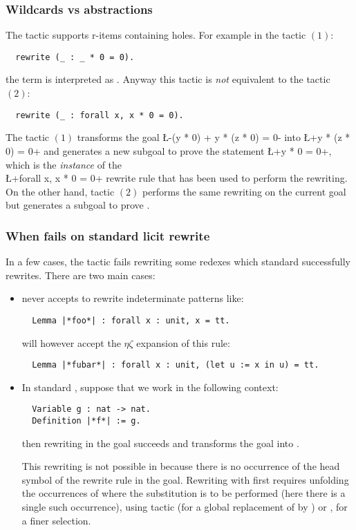 \subsubsection*{Wildcards vs abstractions}
     The  tactic supports r-items containing holes. For example
      in the tactic $(1)$:
\begin{lstlisting}
  rewrite (_ : _ * 0 = 0).
\end{lstlisting}
      the term  is interpreted as .
      Anyway this tactic is \emph{not} equivalent to the tactic $(2)$:
\begin{lstlisting}
  rewrite (_ : forall x, x * 0 = 0).
\end{lstlisting}
      The tactic $(1)$ transforms the goal
      \L-(y * 0) + y * (z * 0) = 0- into \L+y * (z * 0) = 0+
      and generates a new subgoal to prove the statement \L+y * 0 = 0+,
      which is the \emph{instance} of the\\ \L+forall x, x * 0 = 0+
      rewrite rule that
      has been used to perform the rewriting. On the other hand, tactic
      $(2)$ performs the same rewriting on the current goal but generates a
      subgoal to prove .

\subsubsection*{When \ssr{}  fails on standard \Coq{} licit rewrite}
In a few cases, the \ssr{}  tactic fails
rewriting some redexes which standard \Coq{} successfully rewrites.
There are two main cases:

\begin{itemize}
\item \ssr{} never accepts to rewrite indeterminate patterns like:
\begin{lstlisting}
  Lemma |*foo*| : forall x : unit, x = tt.
\end{lstlisting}
\ssr{} will however accept the $\eta\zeta$ expansion of this rule:
\begin{lstlisting}
  Lemma |*fubar*| : forall x : unit, (let u := x in u) = tt.
\end{lstlisting}
\item In standard \Coq{}, suppose that we work in the following context:
\begin{lstlisting}
  Variable g : nat -> nat.
  Definition |*f*| := g.
\end{lstlisting}
then rewriting  in the goal
 succeeds
and transforms the goal into .

This rewriting is not possible in \ssr{} because there is no
occurrence of the head symbol  of the rewrite rule in the
goal. Rewriting with  first requires unfolding the occurrences of
 where the substitution is to be performed (here there is a single
such occurrence), using tactic  (for a global
replacement of  by ) or , for a
finer selection.
\end{itemize}

